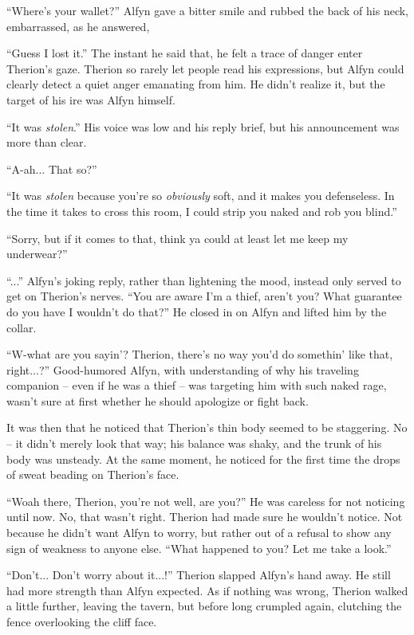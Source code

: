 ``Where's your wallet?'' Alfyn gave a bitter smile and rubbed the back of his neck, embarrassed, as he answered,

``Guess I lost it.'' The instant he said that, he felt a trace of danger enter Therion's gaze. Therion so rarely let people read his expressions, but Alfyn could clearly detect a quiet anger emanating from him. He didn't realize it, but the target of his ire was Alfyn himself.

``It was \emph{stolen}.'' His voice was low and his reply brief, but his announcement was more than clear.

``A-ah... That so?''

``It was \emph{stolen} because you're so \emph{obviously} soft, and it makes you defenseless. In the time it takes to cross this room, I could strip you naked and rob you blind.''

``Sorry, but if it comes to that, think ya could at least let me keep my underwear?''

``...'' Alfyn's joking reply, rather than lightening the mood, instead only served to get on Therion's nerves. ``You are aware I'm a thief, aren't you? What guarantee do you have I wouldn't do that?'' He closed in on Alfyn and lifted him by the collar.

``W-what are you sayin'? Therion, there's no way you'd do somethin' like that, right...?'' Good-humored Alfyn, with understanding of why his traveling companion -- even if he was a thief -- was targeting him with such naked rage, wasn't sure at first whether he should apologize or fight back.

It was then that he noticed that Therion's thin body seemed to be staggering. No -- it didn't merely look that way; his balance was shaky, and the trunk of his body was unsteady. At the same moment, he noticed for the first time the drops of sweat beading on Therion's face. 

``Woah there, Therion, you're not well, are you?'' He was careless for not noticing until now. No, that wasn't right. Therion had made sure he wouldn't notice. Not because he didn't want Alfyn to worry, but rather out of a refusal to show any sign of weakness to anyone else. ``What happened to you? Let me take a look.''

``Don't... Don't worry about it...!'' Therion slapped Alfyn's hand away. He still had more strength than Alfyn expected. As if nothing was wrong, Therion walked a little further, leaving the tavern, but before long crumpled again, clutching the fence overlooking the cliff face.

